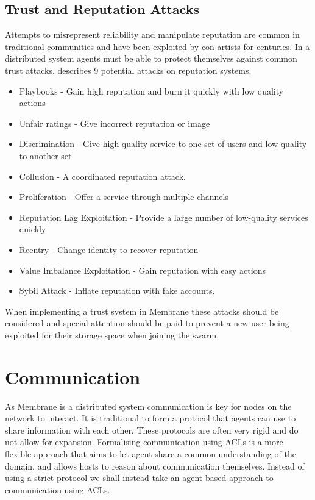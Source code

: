\documentclass[a4paper, 11pt, twocolumn, twoside]{report}
\begin{document}
\subsection{Trust and Reputation Attacks}

Attempts to misrepresent reliability and manipulate reputation are common in traditional communities and have been exploited by con artists for centuries. In a distributed system agents must be able to protect themselves against common trust attacks. \cite{josang2009challenges} describes 9 potential attacks on reputation systems.
\begin{itemize}
 \item Playbooks - Gain high reputation and burn it quickly with low quality actions
 \item Unfair ratings - Give incorrect reputation or image
 \item Discrimination - Give high quality service to one set of users and low quality to another set
 \item Collusion - A coordinated reputation attack.
 \item Proliferation - Offer a service through multiple channels
 \item Reputation Lag Exploitation - Provide a large number of low-quality services quickly
 \item Reentry - Change identity to recover reputation
 \item Value Imbalance Exploitation - Gain reputation with easy actions
 \item Sybil Attack - Inflate reputation with fake accounts.
\end{itemize}
When implementing a trust system in Membrane these attacks should be considered and special attention should be paid to prevent a new user being exploited for their storage space when joining the swarm.

\section{Communication}

As Membrane is a distributed system communication is key for nodes on the network to interact. It is traditional to form a protocol that agents can use to share information with each other. These protocols are often very rigid and do not allow for expansion. Formalising communication using ACLs is a more flexible approach that aims to let agent share a common understanding of the domain, and allows hosts to reason about communication themselves. Instead of using a strict protocol we shall instead take an agent-based approach to communication using ACLs.
\end{document}
